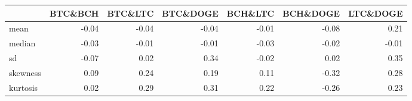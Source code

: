 
\begin{tabular}{l|r|r|r|r|r|r}
\hline
  & BTC\&BCH & BTC\&LTC & BTC\&DOGE & BCH\&LTC & BCH\&DOGE & LTC\&DOGE\\
\hline
mean & -0.04 & -0.04 & -0.04 & -0.01 & -0.08 & 0.21\\
\hline
median & -0.03 & -0.01 & -0.01 & -0.03 & -0.02 & -0.01\\
\hline
sd & -0.07 & 0.02 & 0.34 & -0.02 & 0.02 & 0.35\\
\hline
skewness & 0.09 & 0.24 & 0.19 & 0.11 & -0.32 & 0.28\\
\hline
kurtosis & 0.02 & 0.29 & 0.31 & 0.22 & -0.26 & 0.23\\
\hline
\end{tabular}
